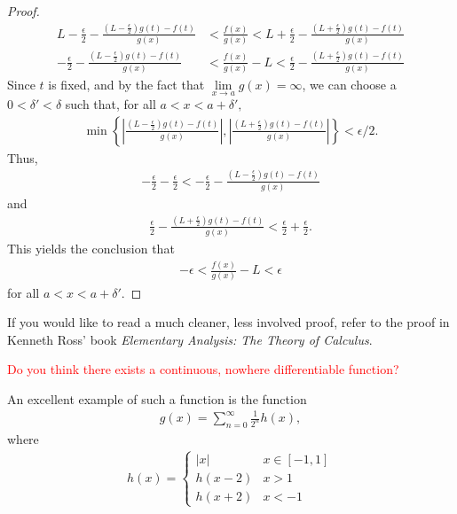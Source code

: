 \documentclass{ximera}
\begin{document}
\begin{proof}
\begin{align*}
       L - \frac{\epsilon}2 - \frac{\left(L - \frac{\epsilon}2\right)g(t) - f(t)}{g(x)} &< \frac{f(x)}{g(x)} < L+ \frac{\epsilon}2 - \frac{\left(L + \frac{\epsilon}2 \right)g(t) - f(t)}{g(x)}
       \\
        - \frac{\epsilon}2 - \frac{\left(L - \frac{\epsilon}2\right)g(t) - f(t)}{g(x)} &< \frac{f(x)}{g(x)} -L < \frac{\epsilon}2 - \frac{\left(L + \frac{\epsilon}2 \right)g(t) - f(t)}{g(x)}
    \end{align*}
    Since $t$ is fixed, and by the fact that $\lim\limits_{x\to a}g(x) = \infty$, we can choose a $0< \delta' < \delta$ such that, for all $a< x< a + \delta',$
    \begin{align*}
        \min\left\{\left|\frac{\left(L - \frac{\epsilon}2\right)g(t) - f(t)}{g(x)}\right|, \left|\frac{\left(L + \frac{\epsilon}2 \right)g(t) - f(t)}{g(x)}\right|\right\} < \epsilon/2.
    \end{align*}
    Thus, 
    \begin{align*}
        -\frac{\epsilon}2 - \frac{\epsilon}2 < - \frac{\epsilon}2 - \frac{\left(L - \frac{\epsilon}2\right)g(t) - f(t)}{g(x)} 
    \end{align*}
     and 
     \begin{align*}
         \frac{\epsilon}2 - \frac{\left(L + \frac{\epsilon}2 \right)g(t) - f(t)}{g(x)}
         < \frac{\epsilon}2 + \frac{\epsilon}2.
     \end{align*}
     This yields the conclusion that 
     \begin{align*}
         -\epsilon < \frac{f(x)}{g(x)} - L < \epsilon
     \end{align*}
     for all $a < x< a+ \delta'$.
\end{proof}

If you would like to read a much cleaner, less involved proof, refer to the proof in Kenneth Ross' book \textit{Elementary Analysis: The Theory of Calculus}.

\textcolor{red}{Do you think there exists a continuous, nowhere differentiable function?}

An excellent example of such a function is the function
\begin{align*}
    g(x) = \sum\limits_{n=0}^\infty \frac{1}{2^n} h(x),
\end{align*}
where
\begin{align*}
    h(x) = \begin{cases}
        |x| & x \in [-1,1]\\
        h(x-2) & x >1 \\
        h(x+2) & x < -1
    \end{cases} 
\end{align*}
\end{document}

